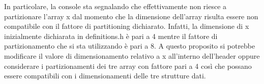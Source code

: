 In particolare, la console sta segnalando che effettivamente non riesce a partizionare l'array x dal momento che la dimensione dell'array risulta essere non compatibile con il fattore di partitioning dichiarato. Infatti, la dimensione di x inizialmente dichiarata in definitions.h è pari a 4 mentre il fattore di partizionamento che si sta utilizzando è pari a 8. A questo proposito si potrebbe modificare il valore di dimensionamento relativo a x all'interno dell'header oppure considerare i partizionamenti dei tre array con fattore pari a 4 così che possano essere compatibili con i dimensionamenti delle tre strutture dati. 